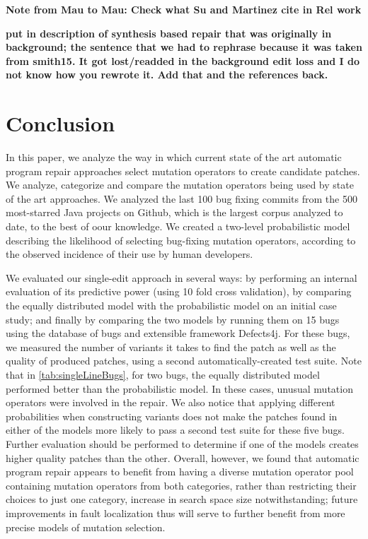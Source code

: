 \documentclass[conference]{IEEEtran}
\newcommand{\todo}[1]
  {{\scriptsize \textbf{\color{red} {#1}}}}
\begin{document}
\todo{Note from Mau to Mau: Check what Su and Martinez cite in Rel work}

\todo{put in description of synthesis based repair that was originally in
  background; the sentence that we had to rephrase because it was taken from
  smith15.  It got lost/readded in the background edit loss and I do not know how
  you rewrote it.  Add that and the references back.}

\section{Conclusion} \label{conclusion}

In this paper, we analyze the way in which current state of the art automatic 
program repair approaches select mutation operators to create candidate 
patches. We analyze, categorize and compare the mutation operators being used by 
state of the art approaches. We analyzed the last 100 bug fixing commits from the
500 most-starred Java projects on Github, which is the largest corpus analyzed
to date, to the best of oour knowledge.  We created a two-level probabilistic model describing
the likelihood of selecting bug-fixing mutation operators, according to the
observed incidence of their use by human developers. 

We evaluated our single-edit approach in several ways: by performing an internal evaluation of 
its predictive power (using 10 fold cross 
validation), by comparing the equally distributed model with the probabilistic
 model on an initial case study; and finally by comparing the two models 
 by running them on 15 bugs using the database of bugs and extensible 
framework Defects4j. For these bugs, we measured the number of variants it takes to find the 
patch as well as the quality of produced patches, using a second automatically-created test suite.
Note that in \ref{tab:singleLineBugs}, for two bugs,
the equally distributed model performed better than the probabilistic
model. In these cases, unusual mutation operators were involved in the repair. 
We also notice that applying different probabilities when constructing variants
does not make the patches found in either of the models more likely to pass a
second test suite for these five bugs. Further evaluation should be performed to
determine if one of the models creates higher quality patches than the other. 
Overall, however, we found that automatic program repair appears to benefit
from having a diverse mutation operator pool containing mutation operators from both categories,
rather than restricting their choices to just one category, increase in search
space size notwithstanding; future improvements in fault localization thus will
serve to further benefit from more precise models of mutation selection. 
\end{document}
